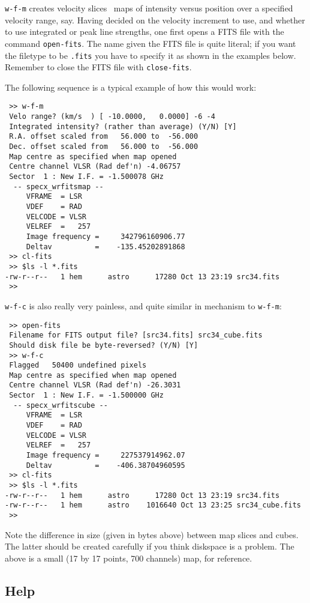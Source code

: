 {\tt w-f-m} creates velocity slices 
\ie\ maps of intensity versus position over a specified velocity range, say.
Having decided on the velocity increment to use, and whether to use
integrated or peak line strengths, one first opens a FITS file with
the command
\verb|open-fits|. The name given the FITS file is quite literal; if
you want the filetype to be {\tt .fits} you have to specify it as
shown in the examples below. 
Remember to close the FITS file with {\tt close-fits}.

The following sequence is a typical example of how this would work: 

\begin{verbatim}
 >> w-f-m
 Velo range? (km/s  ) [ -10.0000,   0.0000] -6 -4
 Integrated intensity? (rather than average) (Y/N) [Y] 
 R.A. offset scaled from   56.000 to  -56.000
 Dec. offset scaled from   56.000 to  -56.000
 Map centre as specified when map opened
 Centre channel VLSR (Rad def'n) -4.06757    
 Sector  1 : New I.F. = -1.500078 GHz
  -- specx_wrfitsmap --
     VFRAME  = LSR 
     VDEF    = RAD
     VELCODE = VLSR    
     VELREF  =   257
     Image frequency =     342796160906.77
     Deltav          =    -135.45202891868
 >> cl-fits
 >> $ls -l *.fits
-rw-r--r--   1 hem      astro      17280 Oct 13 23:19 src34.fits
 >> 
\end{verbatim}

{\tt w-f-c} is also really very painless, and quite similar in
mechanism to {\tt w-f-m}:
\begin{verbatim}
 >> open-fits
 Filename for FITS output file? [src34.fits] src34_cube.fits
 Should disk file be byte-reversed? (Y/N) [Y] 
 >> w-f-c
 Flagged   50400 undefined pixels
 Map centre as specified when map opened
 Centre channel VLSR (Rad def'n) -26.3031    
 Sector  1 : New I.F. = -1.500000 GHz
  -- specx_wrfitscube --
     VFRAME  = LSR 
     VDEF    = RAD
     VELCODE = VLSR    
     VELREF  =   257
     Image frequency =     227537914962.07
     Deltav          =    -406.38704960595
 >> cl-fits
 >> $ls -l *.fits
-rw-r--r--   1 hem      astro      17280 Oct 13 23:19 src34.fits
-rw-r--r--   1 hem      astro    1016640 Oct 13 23:25 src34_cube.fits
 >>
\end{verbatim}

Note the difference in size (given in bytes above) between map slices
and cubes. The latter should be created carefully if you think
diskspace is a problem. The above is a small (17 by 17 points, 700
channels) map, for reference.

\subsection{Help}
\label{sec:specx_14}

